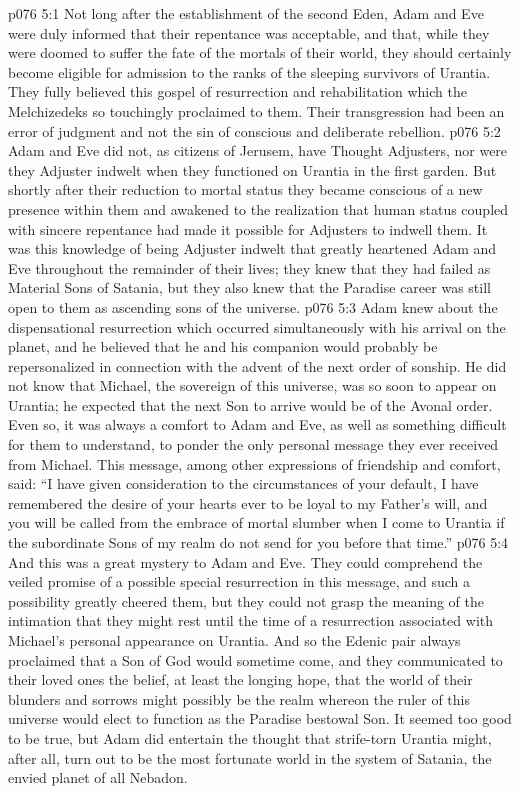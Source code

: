 \vs p076 5:1 Not long after the establishment of the second Eden, Adam and Eve were duly informed that their repentance was acceptable, and that, while they were doomed to suffer the fate of the mortals of their world, they should certainly become eligible for admission to the ranks of the sleeping survivors of Urantia. They fully believed this gospel of resurrection and rehabilitation which the Melchizedeks so touchingly proclaimed to them. Their transgression had been an error of judgment and not the sin of conscious and deliberate rebellion.
\vs p076 5:2 Adam and Eve did not, as citizens of Jerusem, have Thought Adjusters, nor were they Adjuster indwelt when they functioned on Urantia in the first garden. But shortly after their reduction to mortal status they became conscious of a new presence within them and awakened to the realization that human status coupled with sincere repentance had made it possible for Adjusters to indwell them. It was this knowledge of being Adjuster indwelt that greatly heartened Adam and Eve throughout the remainder of their lives; they knew that they had failed as Material Sons of Satania, but they also knew that the Paradise career was still open to them as ascending sons of the universe.
\vs p076 5:3 \pc Adam knew about the dispensational resurrection which occurred simultaneously with his arrival on the planet, and he believed that he and his companion would probably be repersonalized in connection with the advent of the next order of sonship. He did not know that Michael, the sovereign of this universe, was so soon to appear on Urantia; he expected that the next Son to arrive would be of the Avonal order. Even so, it was always a comfort to Adam and Eve, as well as something difficult for them to understand, to ponder the only personal message they ever received from Michael. This message, among other expressions of friendship and comfort, said: “I have given consideration to the circumstances of your default, I have remembered the desire of your hearts ever to be loyal to my Father’s will, and you will be called from the embrace of mortal slumber when I come to Urantia if the subordinate Sons of my realm do not send for you before that time.”
\vs p076 5:4 And this was a great mystery to Adam and Eve. They could comprehend the veiled promise of a possible special resurrection in this message, and such a possibility greatly cheered them, but they could not grasp the meaning of the intimation that they might rest until the time of a resurrection associated with Michael’s personal appearance on Urantia. And so the Edenic pair always proclaimed that a Son of God would sometime come, and they communicated to their loved ones the belief, at least the longing hope, that the world of their blunders and sorrows might possibly be the realm whereon the ruler of this universe would elect to function as the Paradise bestowal Son. It seemed too good to be true, but Adam did entertain the thought that strife\hyp{}torn Urantia might, after all, turn out to be the most fortunate world in the system of Satania, the envied planet of all Nebadon.

